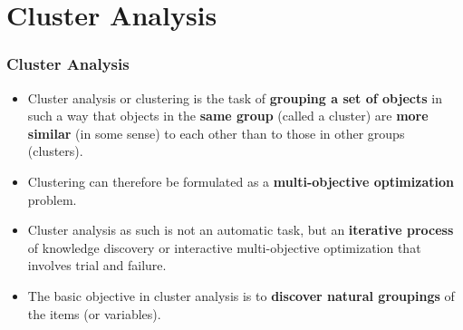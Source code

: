 \documentclass[10pt]{beamer} %
\begin{document}
\section{Cluster Analysis}

\begin{frame}
   \frametitle{Cluster Analysis}
   \begin{itemize}
      \item Cluster analysis or clustering is the task of \textbf{grouping a set
         of objects} in such a way that objects in the \textbf{same group}
         (called a cluster) are \textbf{more similar} (in some sense) to each
         other than to those in other groups (clusters).  
         \vspace{0.5cm}
      \item Clustering can therefore be formulated as a \textbf{multi-objective optimization} problem.
         \vspace{0.5cm}
      \item Cluster analysis as such is not an automatic task, but an
         \textbf{iterative process} of knowledge discovery or interactive
         multi-objective optimization that involves trial and failure.
         \vspace{0.5cm}
      \item The basic objective in cluster analysis is to \textbf{discover
         natural groupings} of the items (or variables).
   \end{itemize}
\end{frame}


%
%
\end{document}
